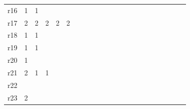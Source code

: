 {\begin{tabular}{l*{21}{r}}
r16& \cellcolor{magenta!10} 1& \cellcolor{magenta!10} 1& & & & & & & & & & & & & & & & & & & \\ 
r17& \cellcolor{magenta!10} 2& \cellcolor{magenta!10} 2& \cellcolor{magenta!10} 2& \cellcolor{magenta!10} 2& \cellcolor{magenta!10} 2& & & & & & & & & & & & & & & & \\ 
r18& \cellcolor{cyan!10} 1& \cellcolor{cyan!10} 1& & & & & & & & & & & & & & & & & & & \\ 
r19& \cellcolor{magenta!10} 1& \cellcolor{magenta!10} 1& & & & & & & & & & & & & & & & & & & \\ 
r20& \cellcolor{cyan!10} 1& & & & & & & & & & & & & & & & & & & & \\ 
r21& \cellcolor{magenta!10} 2& \cellcolor{magenta!10} 1& \cellcolor{magenta!10} 1& & & & & & & & & & & & & & & & & & \\ 
r22& & & & & & & & & & & & & & & & & & & & & \\ 
r23& \cellcolor{magenta!10} 2& & & & & & & & & & & & & & & & & & & & \\ 
\bottomrule
\end{tabular}
}
